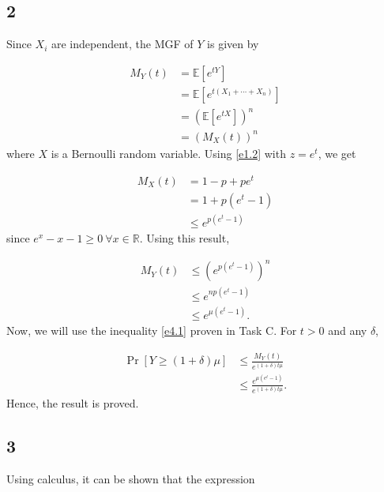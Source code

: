 \subsection*{2}

Since $X_i$ are independent, the MGF of $Y$ is given by

\begin{equation*}
    \begin{aligned}
        M_Y(t) &= \mathbb{E}[e^{tY}] \\
        &= \mathbb{E}[e^{t(X_1+\cdots+X_n)}] \\
        &= \left(\mathbb{E}[e^{tX}]\right)^n \\
        &= (M_X(t))^n
    \end{aligned}
\end{equation*}
where $X$ is a Bernoulli random variable. Using \ref{e1.2} with $z=e^t$, we get

\begin{equation*}
    \begin{aligned}
        M_X(t) &= 1-p +pe^t \\
        &= 1+p(e^t-1) \\
        &\le e^{p(e^t-1)}
    \end{aligned}
\end{equation*}
since $e^x-x-1\ge 0\ \forall x\in\mathbb{R}$. Using this result,

\begin{equation*}
    \begin{aligned}
        M_Y(t) &\le \left(e^{p(e^t-1)}\right)^n \\
        &\le e^{np(e^t-1)} \\
        &\le e^{\mu(e^t-1)}.
    \end{aligned}
\end{equation*}
Now, we will use the inequality \ref{e4.1} proven in Task C. For $t>0$ and any
$\delta$,

\begin{equation*}
    \begin{aligned}
        \Pr[Y\ge (1+\delta)\mu] &\le \frac{M_Y(t)}{e^{(1+\delta)t\mu}} \\
        &\le \frac{e^{\mu(e^t-1)}}{e^{(1+\delta)t\mu}}.
    \end{aligned}
\end{equation*}
Hence, the result is proved.
 
\subsection*{3}
Using calculus, it can be shown that the expression

